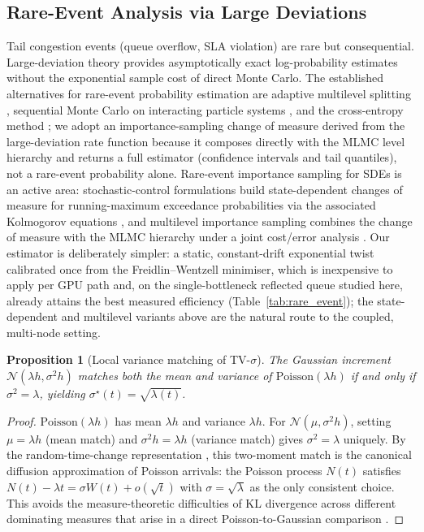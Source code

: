 \documentclass{ieeeaccess}
\newtheorem{proposition}{Proposition}
\begin{document}
\subsection{Rare-Event Analysis via Large Deviations}
\label{subsec:rare_event}

Tail congestion events (queue overflow, SLA violation) are rare but consequential.
Large-deviation theory provides asymptotically exact log-probability estimates without the
exponential sample cost of direct Monte Carlo. The established alternatives for rare-event
probability estimation are adaptive multilevel splitting \cite{cerou2007adaptive}, sequential
Monte Carlo on interacting particle systems \cite{del2004feynman}, and the cross-entropy method
\cite{rubinstein2004cross}; we adopt an importance-sampling change of measure derived from the
large-deviation rate function because it composes directly with the MLMC level hierarchy and
returns a full estimator (confidence intervals and tail quantiles), not a rare-event probability
alone. Rare-event importance sampling for SDEs is an active area: stochastic-control formulations
build state-dependent changes of measure for running-maximum exceedance probabilities via the
associated Kolmogorov equations \cite{benrached2026ensemble}, and multilevel importance sampling
combines the change of measure with the MLMC hierarchy under a joint cost/error analysis
\cite{benrached2025multilevel}. Our estimator is deliberately simpler: a static, constant-drift
exponential twist calibrated once from the Freidlin--Wentzell minimiser, which is inexpensive to
apply per GPU path and, on the single-bottleneck reflected queue studied here, already attains the
best measured efficiency (Table~\ref{tab:rare_event}); the state-dependent and multilevel variants
above are the natural route to the coupled, multi-node setting.

\begin{proposition}[Local variance matching of TV-$\sigma$]
\label{prop:variance_matching}
The Gaussian increment $\mathcal{N}(\lambda h, \sigma^2 h)$ matches both the mean and
variance of $\mathrm{Poisson}(\lambda h)$ if and only if $\sigma^{2}=\lambda$,
yielding $\sigma^\star(t)=\sqrt{\lambda(t)}$.
\end{proposition}
\begin{proof}
$\mathrm{Poisson}(\lambda h)$ has mean $\lambda h$ and variance $\lambda h$.
For $\mathcal{N}(\mu,\sigma^2 h)$, setting $\mu=\lambda h$ (mean match) and
$\sigma^2 h=\lambda h$ (variance match) gives $\sigma^2=\lambda$ uniquely.
By the random-time-change representation \cite{ethier1986markov}, this
two-moment match is the canonical diffusion approximation of Poisson arrivals:
the Poisson process $N(t)$ satisfies $N(t)-\lambda t = \sigma W(t)+o(\sqrt{t})$ with
$\sigma=\sqrt{\lambda}$ as the only consistent choice. This avoids the
measure-theoretic difficulties of KL divergence across different dominating measures
that arise in a direct Poisson-to-Gaussian comparison \cite{kabanov1978,liptser2001statistics}.
\end{proof}
\end{document}

